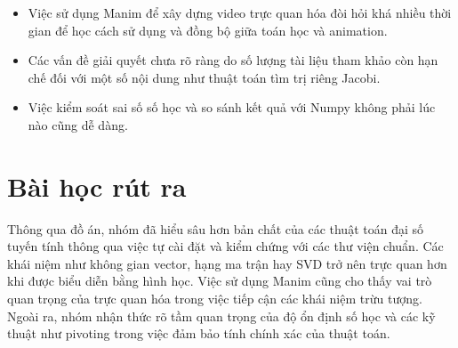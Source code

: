 \begin{itemize}[topsep=0pt, itemsep=2.5pt, leftmargin=1.5cm]
    \item Việc sử dụng Manim để xây dựng video trực quan hóa đòi hỏi khá nhiều thời gian để học cách sử dụng và đồng bộ giữa toán học và animation.
    \item Các vấn đề giải quyết chưa rõ ràng do số lượng tài liệu tham khảo còn hạn chế đối với một số nội dung như thuật toán tìm trị riêng Jacobi.
    \item Việc kiểm soát sai số số học và so sánh kết quả với Numpy không phải lúc nào cũng dễ dàng.
\end{itemize}

\newpage

\section{Bài học rút ra}

Thông qua đồ án, nhóm đã hiểu sâu hơn bản chất của các thuật toán đại số tuyến tính thông qua việc tự cài đặt và kiểm chứng với các thư viện chuẩn. Các khái niệm như không gian vector, hạng ma trận hay SVD trở nên trực quan hơn khi được biểu diễn bằng hình học. Việc sử dụng Manim cũng cho thấy vai trò quan trọng của trực quan hóa trong việc tiếp cận các khái niệm trừu tượng. Ngoài ra, nhóm nhận thức rõ tầm quan trọng của độ ổn định số học và các kỹ thuật như pivoting trong việc đảm bảo tính chính xác của thuật toán.